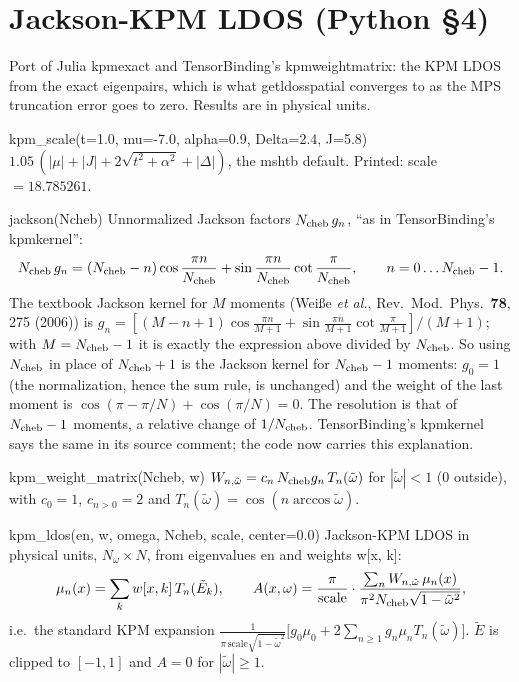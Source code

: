 \documentclass[11pt]{article}
\newcommand{\codeus}{\textunderscore\allowbreak}
\renewcommand{\code}[1]{{\ttfamily\let\_\codeus #1}}
\begin{document}
\section{Jackson-KPM LDOS (Python §4)}
\label{sec:py-kpm}

Port of Julia \code{kpm\_exact} and TensorBinding's \code{\_kpm\_weight\_matrix}: the KPM LDOS from the exact eigenpairs, which is what \code{get\_ldos\_spatial} converges to as the MPS truncation error goes to zero. Results are in physical units.

\begin{function}{kpm\_scale(t=1.0, mu=-7.0, alpha=0.9, Delta=2.4, J=5.8)}
$1.05\,(|\mu|+|J|+2\sqrt{t^2+\alpha^2}+|\Delta|)$, the \code{msh\_tb} default. Printed: scale $=18.785261$.
\end{function}

\begin{function}{jackson(Ncheb)}
Unnormalized Jackson factors $N_{\rm cheb}\,g_n$, ``as in TensorBinding's \code{\_kpm\_kernel}'':
\[
N_{\rm cheb}\,g_n=(N_{\rm cheb}-n)\cos\frac{\pi n}{N_{\rm cheb}}+\sin\frac{\pi n}{N_{\rm cheb}}\cot\frac{\pi}{N_{\rm cheb}},\qquad n=0\dots N_{\rm cheb}-1 .
\]
The textbook Jackson kernel for $M$ moments (Weiße \emph{et al.}, Rev.\ Mod.\ Phys.\ \textbf{78}, 275 (2006)) is
$g_n=[(M-n+1)\cos\frac{\pi n}{M+1}+\sin\frac{\pi n}{M+1}\cot\frac{\pi}{M+1}]/(M+1)$; with $M=N_{\rm cheb}-1$ it is exactly the expression above
divided by $N_{\rm cheb}$. So using $N_{\rm cheb}$ in place of $N_{\rm cheb}+1$ is the Jackson kernel for $N_{\rm cheb}-1$ moments: $g_0=1$ (the
normalization, hence the sum rule, is unchanged) and the weight of the last moment is $\cos(\pi-\pi/N)+\cos(\pi/N)=0$. The resolution is that of
$N_{\rm cheb}-1$ moments, a relative change of $1/N_{\rm cheb}$. TensorBinding's \code{\_kpm\_kernel} says the same in its source comment; the
code now carries this explanation.
\end{function}

\begin{function}{kpm\_weight\_matrix(Ncheb, w)}
$W_{n,\tilde\omega}=c_n\,N_{\rm cheb}g_n\,T_n(\tilde\omega)$ for $|\tilde\omega|<1$ (0 outside), with $c_0=1$, $c_{n>0}=2$ and $T_n(\tilde\omega)=\cos(n\arccos\tilde\omega)$.
\end{function}

\begin{function}{kpm\_ldos(en, w, omega, Ncheb, scale, center=0.0)}
Jackson-KPM LDOS in physical units, $N_\omega\times N$, from eigenvalues \code{en} and weights \code{w[x, k]}:
\[
\mu_n(x)=\sum_kw[x,k]\,T_n(\tilde E_k),\qquad
A(x,\omega)=\frac{\pi}{\text{scale}}\cdot\frac{\sum_nW_{n,\tilde\omega}\,\mu_n(x)}{\pi^2N_{\rm cheb}\sqrt{1-\tilde\omega^2}},
\]
i.e.\ the standard KPM expansion $\frac{1}{\pi\,\text{scale}\sqrt{1-\tilde\omega^2}}\bigl[g_0\mu_0+2\sum_{n\ge1}g_n\mu_nT_n(\tilde\omega)\bigr]$. $\tilde E$ is clipped to $[-1,1]$ and $A=0$ for $|\tilde\omega|\ge1$.
\end{function}
\end{document}
